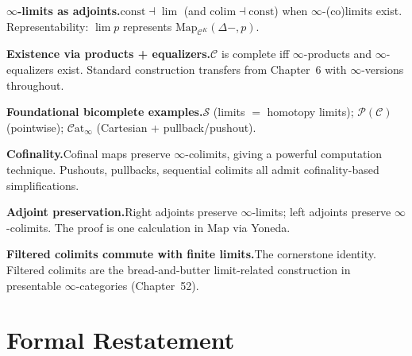 \begin{summarybox}
\textbf{$\infty$-limits as adjoints.}\quad $\mathrm{const} \dashv \lim$
(and $\mathrm{colim} \dashv \mathrm{const}$) when $\infty$-(co)limits
exist. Representability: $\lim p$ represents
$\mathrm{Map}_{\mathcal{C}^K}(\Delta -, p)$.

\textbf{Existence via products + equalizers.}\quad $\mathcal{C}$ is
complete iff $\infty$-products and $\infty$-equalizers exist. Standard
construction transfers from Chapter~6 with $\infty$-versions throughout.

\textbf{Foundational bicomplete examples.}\quad $\mathcal{S}$ (limits $=$
homotopy limits); $\mathcal{P}(\mathcal{C})$ (pointwise); $\mathcal{C}\mathrm{at}_\infty$
(Cartesian + pullback/pushout).

\textbf{Cofinality.}\quad Cofinal maps preserve $\infty$-colimits, giving
a powerful computation technique. Pushouts, pullbacks, sequential
colimits all admit cofinality-based simplifications.

\textbf{Adjoint preservation.}\quad Right adjoints preserve $\infty$-limits;
left adjoints preserve $\infty$-colimits. The proof is one calculation in
$\mathrm{Map}$ via Yoneda.

\textbf{Filtered colimits commute with finite limits.}\quad The cornerstone
identity. Filtered colimits are the bread-and-butter limit-related
construction in presentable $\infty$-categories (Chapter~52).
\end{summarybox}


\section*{Formal Restatement}

